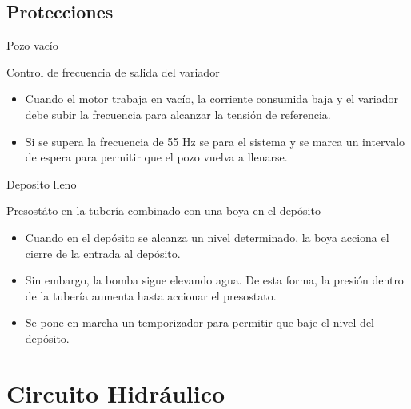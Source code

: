 \documentclass[xcolor={usenames,svgnames,dvipsnames}]{beamer}
\begin{document}
\subsection{Protecciones}
\label{sec:orgd3ededb}

\begin{frame}[label={sec:orgddef6f4}]{Pozo vacío}
\begin{block}{Control de frecuencia de salida del variador}
\begin{itemize}
\item Cuando el motor trabaja en vacío, la corriente consumida baja y el variador debe subir la frecuencia para alcanzar la tensión de referencia.

\item Si se supera la frecuencia de 55 Hz se para el sistema y se marca un intervalo de espera para permitir que el pozo vuelva a llenarse.
\end{itemize}
\end{block}
\end{frame}

\begin{frame}[label={sec:org7a35c2c}]{Deposito lleno}
\begin{block}{Presostáto en la tubería combinado con una boya en el depósito}
\begin{itemize}
\item Cuando en el depósito se alcanza un nivel determinado, la boya acciona el cierre de la entrada al depósito.

\item Sin embargo, la bomba sigue elevando agua. De esta forma, la presión dentro de la tubería aumenta hasta accionar el presostato.

\item Se pone en marcha un temporizador para permitir que baje el nivel del depósito.
\end{itemize}
\end{block}
\end{frame}


\section{Circuito Hidráulico}
\label{sec:org01f425b}
\end{document}
